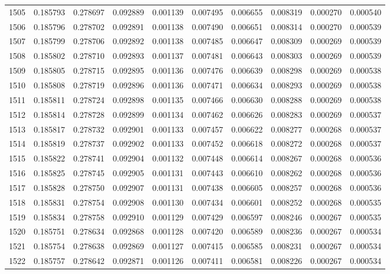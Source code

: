 \begin{tabular}{lrrrrrrrrr}
1505 & 0.185793 & 0.278697 & 0.092889 & 0.001139 & 0.007495 & 0.006655 & 0.008319 & 0.000270 & 0.000540 \\
1506 & 0.185796 & 0.278702 & 0.092891 & 0.001138 & 0.007490 & 0.006651 & 0.008314 & 0.000270 & 0.000539 \\
1507 & 0.185799 & 0.278706 & 0.092892 & 0.001138 & 0.007485 & 0.006647 & 0.008309 & 0.000269 & 0.000539 \\
1508 & 0.185802 & 0.278710 & 0.092893 & 0.001137 & 0.007481 & 0.006643 & 0.008303 & 0.000269 & 0.000539 \\
1509 & 0.185805 & 0.278715 & 0.092895 & 0.001136 & 0.007476 & 0.006639 & 0.008298 & 0.000269 & 0.000538 \\
1510 & 0.185808 & 0.278719 & 0.092896 & 0.001136 & 0.007471 & 0.006634 & 0.008293 & 0.000269 & 0.000538 \\
1511 & 0.185811 & 0.278724 & 0.092898 & 0.001135 & 0.007466 & 0.006630 & 0.008288 & 0.000269 & 0.000538 \\
1512 & 0.185814 & 0.278728 & 0.092899 & 0.001134 & 0.007462 & 0.006626 & 0.008283 & 0.000269 & 0.000537 \\
1513 & 0.185817 & 0.278732 & 0.092901 & 0.001133 & 0.007457 & 0.006622 & 0.008277 & 0.000268 & 0.000537 \\
1514 & 0.185819 & 0.278737 & 0.092902 & 0.001133 & 0.007452 & 0.006618 & 0.008272 & 0.000268 & 0.000537 \\
1515 & 0.185822 & 0.278741 & 0.092904 & 0.001132 & 0.007448 & 0.006614 & 0.008267 & 0.000268 & 0.000536 \\
1516 & 0.185825 & 0.278745 & 0.092905 & 0.001131 & 0.007443 & 0.006610 & 0.008262 & 0.000268 & 0.000536 \\
1517 & 0.185828 & 0.278750 & 0.092907 & 0.001131 & 0.007438 & 0.006605 & 0.008257 & 0.000268 & 0.000536 \\
1518 & 0.185831 & 0.278754 & 0.092908 & 0.001130 & 0.007434 & 0.006601 & 0.008252 & 0.000268 & 0.000535 \\
1519 & 0.185834 & 0.278758 & 0.092910 & 0.001129 & 0.007429 & 0.006597 & 0.008246 & 0.000267 & 0.000535 \\
1520 & 0.185751 & 0.278634 & 0.092868 & 0.001128 & 0.007420 & 0.006589 & 0.008236 & 0.000267 & 0.000534 \\
1521 & 0.185754 & 0.278638 & 0.092869 & 0.001127 & 0.007415 & 0.006585 & 0.008231 & 0.000267 & 0.000534 \\
1522 & 0.185757 & 0.278642 & 0.092871 & 0.001126 & 0.007411 & 0.006581 & 0.008226 & 0.000267 & 0.000534 \\

\end{tabular}
